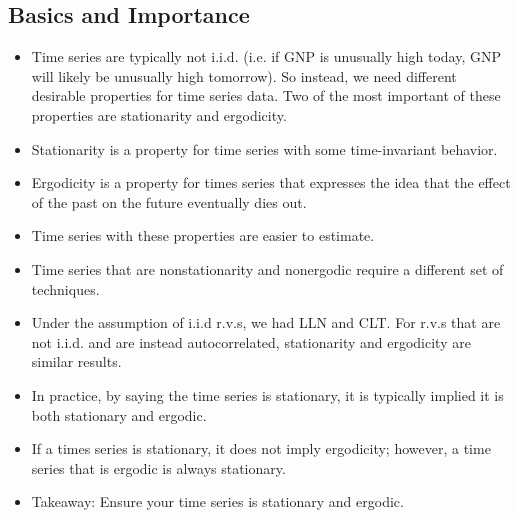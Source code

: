 \documentclass[11pt]{article}
\begin{document}
\subsection{Basics and Importance}
\begin{itemize}
    \item Time series are typically not i.i.d. (i.e. if GNP is unusually high today, GNP will 
    likely be unusually high tomorrow). So instead, we need different desirable properties for 
    time series data. Two of the most important of these properties are stationarity and 
    ergodicity. 
    \item Stationarity is a property for time series with some time-invariant behavior.
    \item Ergodicity is a property for times series that expresses the idea that the effect of 
    the past on the future eventually dies out.
    \item Time series with these properties are easier to estimate.
    \item Time series that are nonstationarity and nonergodic require a different set of
    techniques.
    \item Under the assumption of i.i.d r.v.s, we had LLN and CLT. For r.v.s that are not 
    i.i.d. and are instead autocorrelated, stationarity and ergodicity are similar results.
    \item In practice, by saying the time series is stationary, it is typically implied it is both
    stationary and ergodic. 
    \item If a times series is stationary, it does not imply ergodicity; however, a time series 
    that is ergodic is always stationary.
    \item Takeaway: Ensure your time series is stationary and ergodic. 
\end{itemize}
\end{document}
